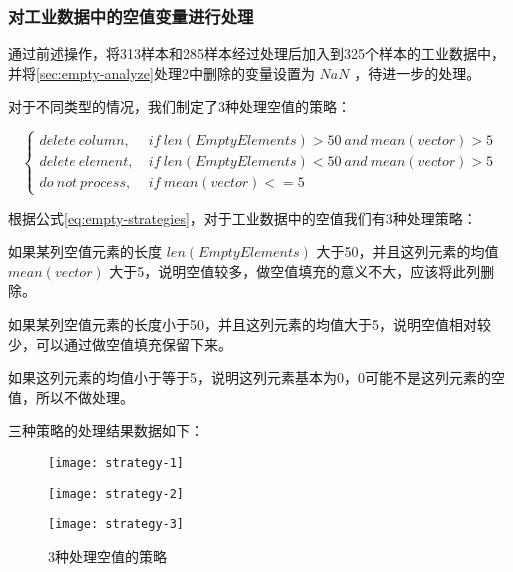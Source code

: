 \documentclass[bwprint]{gmcmthesis}
\begin{document}
\FloatBarrier
\subsubsection{对工业数据中的空值变量进行处理}\label{sec:process-all-nan}

通过前述操作，将313样本和285样本经过处理后加入到325个样本的工业数据中，并将\ref{sec:empty-analyze}处理2中删除的变量设置为 $NaN$ ，待进一步的处理。

对于不同类型的情况，我们制定了3种处理空值的策略：

\begin{equation}\label{eq:empty-strategies}
\left\{
\begin{aligned}
delete \ column, \ & if \ len(EmptyElements)>50 \ and \ mean(vector)>5 \\  
delete \ element, \ & if \ len(EmptyElements)<50 \ and \ mean(vector)>5\\  
do \ not \ process, \ & if \ mean(vector)<=5
\end{aligned}
\right.
\end{equation}

根据公式\eqref{eq:empty-strategies}，对于工业数据中的空值我们有3种处理策略：

\begin{list}{策略\themylist}{}
	\item 如果某列空值元素的长度 $len(EmptyElements)$ 大于50，并且这列元素的均值 $ mean(vector)$ 大于5，说明空值较多，做空值填充的意义不大，应该将此列删除。
	\item 如果某列空值元素的长度小于50，并且这列元素的均值大于5，说明空值相对较少，可以通过做空值填充保留下来。
	\item 如果这列元素的均值小于等于5，说明这列元素基本为0，0可能不是这列元素的空值，所以不做处理。
\end{list}


三种策略的处理结果数据如下：






\begin{figure}[htb]
	\centering
	\begin{minipage}[c]{0.4\textwidth}
		\centering
		\texttt{[image: strategy-1]}
	\end{minipage}
	\begin{minipage}[c]{0.4\textheight}
		\centering
		\texttt{[image: strategy-2]}
	\end{minipage}
	\begin{minipage}[c]{0.4\textwidth}
		\centering
		\texttt{[image: strategy-3]}
	\end{minipage}
	\caption{3种处理空值的策略}
\end{figure}
\end{document}
